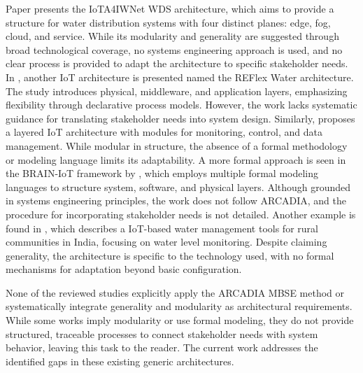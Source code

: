 \documentclass[conference]{IEEEtran}
\begin{document}
Paper \cite{98953990} presents the IoTA4IWNet WDS architecture, which aims to provide a structure for water distribution systems with four distinct planes: edge, fog, cloud, and service. While its modularity and generality are suggested through broad technological coverage, no systems engineering approach is used, and no clear process is provided to adapt the architecture to specific stakeholder needs. In \cite{fi12070114}, another IoT architecture is presented named the REFlex Water architecture. The study introduces physical, middleware, and application layers, emphasizing flexibility through declarative process models. However, the work lacks systematic guidance for translating stakeholder needs into system design.
Similarly, \cite{10042624} proposes a layered IoT architecture with modules for monitoring, control, and data management. While modular in structure, the absence of a formal methodology or modeling language limits its adaptability. A more formal approach is seen in the BRAIN-IoT framework by \cite{tao-mbse}, which employs multiple formal modeling languages to structure system, software, and physical layers. Although grounded in systems engineering principles, the work does not follow ARCADIA, and the procedure for incorporating stakeholder needs is not detailed. Another example is found in \cite{10.13189/ujar.2022.100302}, which describes a IoT-based water management tools for rural communities in India, focusing on water level monitoring. Despite claiming generality, the architecture is specific to the technology used, with no formal mechanisms for adaptation beyond basic configuration.

None of the reviewed studies explicitly apply the ARCADIA MBSE method or systematically integrate generality and modularity as architectural requirements. While some works imply modularity or use formal modeling, they do not provide structured, traceable processes to connect stakeholder needs with system behavior, leaving this task to the reader. The current work addresses the identified gaps in these existing generic architectures.



\end{document}
